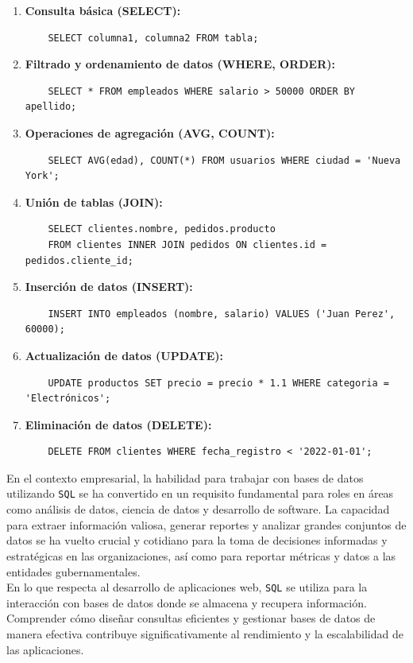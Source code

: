 \begin{enumerate}
    \item \textbf{Consulta básica (SELECT):}
    \begin{verbatim}
    SELECT columna1, columna2 FROM tabla;
    \end{verbatim}

    \item \textbf{Filtrado y ordenamiento de datos (WHERE, ORDER):}
    \begin{verbatim}
    SELECT * FROM empleados WHERE salario > 50000 ORDER BY apellido;
    \end{verbatim}

    \item \textbf{Operaciones de agregación (AVG, COUNT):}
    \begin{verbatim}
    SELECT AVG(edad), COUNT(*) FROM usuarios WHERE ciudad = 'Nueva York';
    \end{verbatim}

    \item \textbf{Unión de tablas (JOIN):}
    \begin{verbatim}
    SELECT clientes.nombre, pedidos.producto 
    FROM clientes INNER JOIN pedidos ON clientes.id = pedidos.cliente_id;
    \end{verbatim}

    \item \textbf{Inserción de datos (INSERT):}
    \begin{verbatim}
    INSERT INTO empleados (nombre, salario) VALUES ('Juan Perez', 60000);
    \end{verbatim}

    \item \textbf{Actualización de datos (UPDATE):}
    \begin{verbatim}
    UPDATE productos SET precio = precio * 1.1 WHERE categoria = 'Electrónicos';
    \end{verbatim}

    \item \textbf{Eliminación de datos (DELETE):}
    \begin{verbatim}
    DELETE FROM clientes WHERE fecha_registro < '2022-01-01';
    \end{verbatim}
\end{enumerate}


En el contexto empresarial, la habilidad para trabajar con bases de datos utilizando \texttt{SQL} se ha convertido en un requisito fundamental para roles en áreas como análisis de datos, ciencia de datos y desarrollo de software. La capacidad para extraer información valiosa, generar reportes y analizar grandes conjuntos de datos se ha vuelto crucial y cotidiano para la toma de decisiones informadas y estratégicas en las organizaciones, así como para reportar métricas y datos a las entidades gubernamentales.
\\
En lo que respecta al desarrollo de aplicaciones web, \texttt{SQL} se utiliza para la interacción con bases de datos donde se almacena y recupera información. Comprender cómo diseñar consultas eficientes y gestionar bases de datos de manera efectiva contribuye significativamente al rendimiento y la escalabilidad de las aplicaciones.\\


